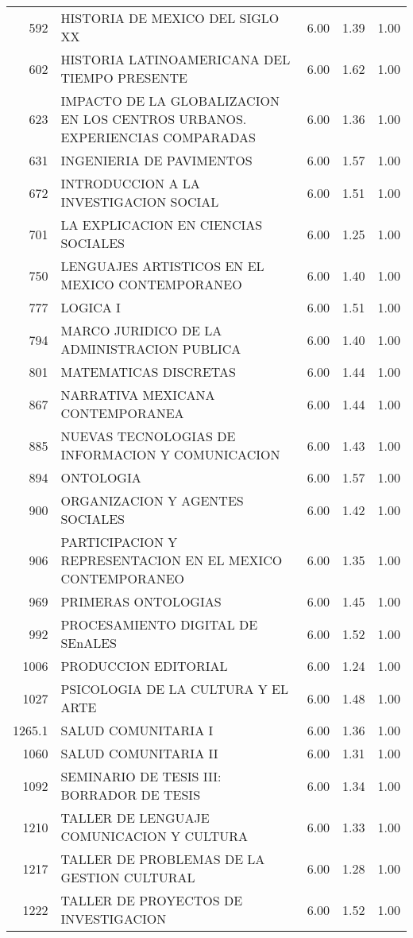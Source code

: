 \documentclass[12pt]{article}
\begin{document}
\begin{table}[ht]
\begin{tabular}{rlrrr}
  592 & HISTORIA DE MEXICO DEL SIGLO XX & 6.00 & 1.39 & 1.00 \\ 
  602 & HISTORIA LATINOAMERICANA DEL TIEMPO PRESENTE & 6.00 & 1.62 & 1.00 \\ 
  623 & IMPACTO DE LA GLOBALIZACION EN LOS CENTROS URBANOS. EXPERIENCIAS COMPARADAS & 6.00 & 1.36 & 1.00 \\ 
  631 & INGENIERIA DE PAVIMENTOS & 6.00 & 1.57 & 1.00 \\ 
  672 & INTRODUCCION A LA INVESTIGACION SOCIAL & 6.00 & 1.51 & 1.00 \\ 
  701 & LA EXPLICACION EN CIENCIAS SOCIALES & 6.00 & 1.25 & 1.00 \\ 
  750 & LENGUAJES ARTISTICOS EN EL MEXICO CONTEMPORANEO & 6.00 & 1.40 & 1.00 \\ 
  777 & LOGICA I & 6.00 & 1.51 & 1.00 \\ 
  794 & MARCO JURIDICO DE LA ADMINISTRACION PUBLICA & 6.00 & 1.40 & 1.00 \\ 
  801 & MATEMATICAS DISCRETAS & 6.00 & 1.44 & 1.00 \\ 
  867 & NARRATIVA MEXICANA CONTEMPORANEA & 6.00 & 1.44 & 1.00 \\ 
  885 & NUEVAS TECNOLOGIAS DE INFORMACION Y COMUNICACION & 6.00 & 1.43 & 1.00 \\ 
  894 & ONTOLOGIA & 6.00 & 1.57 & 1.00 \\ 
  900 & ORGANIZACION Y AGENTES SOCIALES & 6.00 & 1.42 & 1.00 \\ 
  906 & PARTICIPACION Y REPRESENTACION EN EL MEXICO CONTEMPORANEO & 6.00 & 1.35 & 1.00 \\ 
  969 & PRIMERAS ONTOLOGIAS & 6.00 & 1.45 & 1.00 \\ 
  992 & PROCESAMIENTO DIGITAL DE SEnALES & 6.00 & 1.52 & 1.00 \\ 
  1006 & PRODUCCION EDITORIAL & 6.00 & 1.24 & 1.00 \\ 
  1027 & PSICOLOGIA DE LA CULTURA Y EL ARTE & 6.00 & 1.48 & 1.00 \\ 
  1265.1 & SALUD COMUNITARIA I & 6.00 & 1.36 & 1.00 \\ 
  1060 & SALUD COMUNITARIA II & 6.00 & 1.31 & 1.00 \\ 
  1092 & SEMINARIO DE TESIS III: BORRADOR DE TESIS & 6.00 & 1.34 & 1.00 \\ 
  1210 & TALLER DE LENGUAJE COMUNICACION Y CULTURA & 6.00 & 1.33 & 1.00 \\ 
  1217 & TALLER DE PROBLEMAS DE LA GESTION CULTURAL & 6.00 & 1.28 & 1.00 \\ 
  1222 & TALLER DE PROYECTOS DE INVESTIGACION & 6.00 & 1.52 & 1.00 \\ 

\end{tabular}
\end{table}
\end{document}
